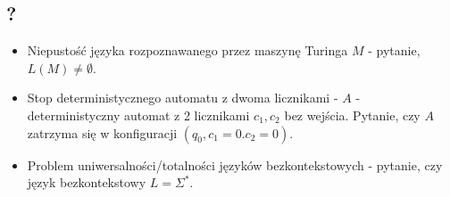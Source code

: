 \documentclass{article}
\theoremstyle{definition}
\theoremstyle{remark}
\begin{document}
\subsection{?}
\begin{itemize}
    \item Niepustość języka rozpoznawanego przez maszynę Turinga $M$ - pytanie, $L(M) \neq \emptyset$.
    \item Stop deterministycznego automatu z dwoma licznikami - $A$ - deterministyczny automat z 2 licznikami $c_1, c_2$ bez wejścia. Pytanie, czy $A$ zatrzyma się w konfiguracji $(q_0, c_1 = 0. c_2=0)$.
    \item Problem uniwersalności/totalności języków bezkontekstowych - pytanie, czy język bezkontekstowy $L = \Sigma^*$.
\end{itemize}
\end{document}
